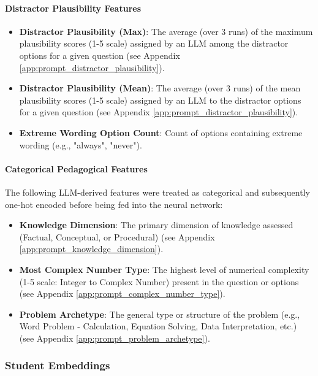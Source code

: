 \documentclass[
    a4paper, %
    10pt, %
    twoside, %
]{LTJournalArticle}
\begin{document}
\paragraph{Distractor Plausibility Features}
\begin{itemize}
    \item \textbf{Distractor Plausibility (Max)}: The average (over 3 runs) of the maximum plausibility scores (1-5 scale) assigned by an LLM among the distractor options for a given question (see Appendix \ref{app:prompt_distractor_plausibility}).
    \item \textbf{Distractor Plausibility (Mean)}: The average (over 3 runs) of the mean plausibility scores (1-5 scale) assigned by an LLM to the distractor options for a given question (see Appendix \ref{app:prompt_distractor_plausibility}).
    \item \textbf{Extreme Wording Option Count}: Count of options containing extreme wording (e.g., "always", "never").
\end{itemize}

\paragraph{Categorical Pedagogical Features}


The following LLM-derived features were treated as categorical and subsequently one-hot encoded before being fed into the neural network:

\begin{itemize}
    \item \textbf{Knowledge Dimension}: The primary dimension of knowledge assessed (Factual, Conceptual, or Procedural) (see Appendix \ref{app:prompt_knowledge_dimension}).
    \item \textbf{Most Complex Number Type}: The highest level of numerical complexity (1-5 scale: Integer to Complex Number) present in the question or options (see Appendix \ref{app:prompt_complex_number_type}).
    \item \textbf{Problem Archetype}: The general type or structure of the problem (e.g., Word Problem - Calculation, Equation Solving, Data Interpretation, etc.) (see Appendix \ref{app:prompt_problem_archetype}).
\end{itemize}

\subsubsection{Student Embeddings}
\end{document}
